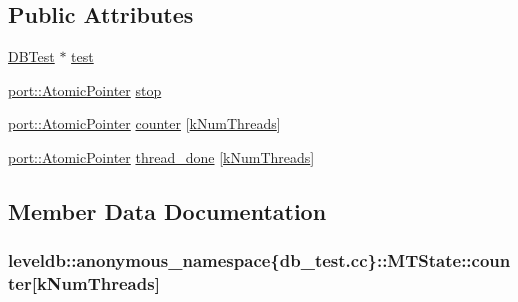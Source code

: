 \subsection*{Public Attributes}
\begin{DoxyCompactItemize}
\item 
\hyperlink{classleveldb_1_1_d_b_test}{D\+B\+Test} $\ast$ \hyperlink{structleveldb_1_1anonymous__namespace_02db__test_8cc_03_1_1_m_t_state_aef289dafc9372f2abb0adfb8476b008e}{test}
\item 
\hyperlink{classleveldb_1_1port_1_1_atomic_pointer}{port\+::\+Atomic\+Pointer} \hyperlink{structleveldb_1_1anonymous__namespace_02db__test_8cc_03_1_1_m_t_state_a367c0e9f6132e934914946929461432f}{stop}
\item 
\hyperlink{classleveldb_1_1port_1_1_atomic_pointer}{port\+::\+Atomic\+Pointer} \hyperlink{structleveldb_1_1anonymous__namespace_02db__test_8cc_03_1_1_m_t_state_a5468945acd726b34c0b9ec06c47e0565}{counter} \mbox{[}\hyperlink{namespaceleveldb_1_1anonymous__namespace_02db__test_8cc_03_af135e865a9f018d5bbf890a1c60aeed0}{k\+Num\+Threads}\mbox{]}
\item 
\hyperlink{classleveldb_1_1port_1_1_atomic_pointer}{port\+::\+Atomic\+Pointer} \hyperlink{structleveldb_1_1anonymous__namespace_02db__test_8cc_03_1_1_m_t_state_a63eaf5722fbff3553a2cc2a494fbe039}{thread\+\_\+done} \mbox{[}\hyperlink{namespaceleveldb_1_1anonymous__namespace_02db__test_8cc_03_af135e865a9f018d5bbf890a1c60aeed0}{k\+Num\+Threads}\mbox{]}
\end{DoxyCompactItemize}


\subsection{Member Data Documentation}
\hypertarget{structleveldb_1_1anonymous__namespace_02db__test_8cc_03_1_1_m_t_state_a5468945acd726b34c0b9ec06c47e0565}{}
\subsubsection[{counter}]{ leveldb\+::anonymous\+\_\+namespace\{db\+\_\+test.\+cc\}\+::M\+T\+State\+::counter\mbox{[}{\bf k\+Num\+Threads}\mbox{]}}\label{structleveldb_1_1anonymous__namespace_02db__test_8cc_03_1_1_m_t_state_a5468945acd726b34c0b9ec06c47e0565}
\hypertarget{structleveldb_1_1anonymous__namespace_02db__test_8cc_03_1_1_m_t_state_a367c0e9f6132e934914946929461432f}{}
